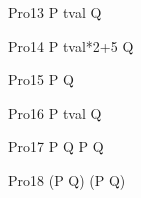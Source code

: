 \begin{circus}
    \circprocess Pro13 \circdef P \circtimeout \lcirctime tval \rcirctime Q\\
\end{circus}        

\begin{circus}
   \circprocess Pro14 \circdef P \circtimeout \lcirctime tval*2+5 \rcirctime Q\\
\end{circus}        

\begin{circus}
    \circprocess Pro15 \circdef P \circtimeout {}  \rcirctime Q\\
\end{circus}        

\begin{circus}
    \circprocess Pro16 \circdef P \circtimeout {} \upto tval \rcirctime  Q\\
\end{circus} 


\begin{circus}
    \circprocess Pro17 \circdef P \circtimeout {} \rcirctime Q \circinterrupt P \circtimeout {} \rcirctime Q \\ 
\end{circus}
    
\begin{circus}
    \circprocess Pro18 \circdef (P \circtimeout {} \rcirctime Q) \circinterrupt (P \circtimeout {} \rcirctime Q) \\
\end{circus}





